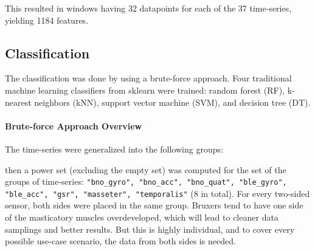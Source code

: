 This resulted in windows having 32 datapoints for each of the 37 time-series, yielding 1184 features.

\subsection{Classification}

The classification was done by using a brute-force approach. Four traditional machine learning classifiers from sklearn were trained: random forest (RF), k-nearest neighbors (kNN), support vector machine (SVM), and decision tree (DT).

\paragraph{Brute-force Approach Overview}

The time-series were generalized into the following groups:


then a power set (excluding the empty set) was computed for the set of the groups of time-series: \texttt{"bno\_gyro", "bno\_acc", "bno\_quat", "ble\_gyro", "ble\_acc", "gsr", "masseter", "temporalis"} (8 in total). For every two-sided sensor, both sides were placed in the same group. Bruxers tend to have one side of the masticatory muscles overdeveloped, which will lead to cleaner data samplings and better results. But this is highly individual, and to cover every possible use-case scenario, the data from both sides is needed.

